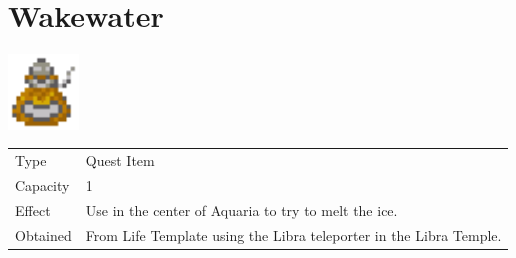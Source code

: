 \section{Wakewater}
\label{item:wakewater}

\includegraphics[height=2cm,keepaspectratio]{./resources/items/wakewater}

\begin{longtable}{ l p{9cm} }
	Type
	& Quest Item
\\ %
	Capacity
	& 1
\\ %
	Effect
	& Use in the center of Aquaria to try to melt the ice.
\\ %
	Obtained
	& From Life Template using the Libra teleporter in the Libra Temple.
\end{longtable}
